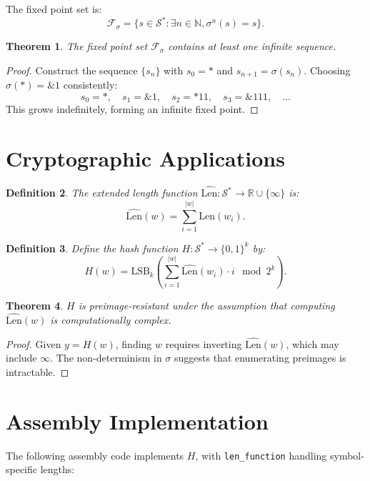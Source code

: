 \documentclass{article}
\newtheorem{theorem}{Theorem}[section]
\newtheorem{definition}[theorem]{Definition}
\begin{document}
The fixed point set is:
\[
\mathcal{F}_\sigma = \{s \in \mathcal{S}^* : \exists n \in \mathbb{N}, \sigma^n(s) = s\}.
\]

\begin{theorem}
    The fixed point set $\mathcal{F}_\sigma$ contains at least one infinite sequence.
\end{theorem}

\begin{proof}
    Construct the sequence $\{s_n\}$ with $s_0 = *$ and $s_{n+1} = \sigma(s_n)$. Choosing $\sigma(*) = \mathbin{\&}1$ consistently:
    \[
    s_0 = *, \quad s_1 = \mathbin{\&}1, \quad s_2 = *11, \quad s_3 = \mathbin{\&}111, \quad \ldots
    \]
    This grows indefinitely, forming an infinite fixed point.
\end{proof}

\section{Cryptographic Applications}
\begin{definition}
    The extended length function $\hat{\text{Len}}: \mathcal{S}^* \to \mathbb{R} \cup \{\infty\}$ is:
    \[
    \hat{\text{Len}}(w) = \sum_{i=1}^{|w|} \text{Len}(w_i).
    \]
\end{definition}

\begin{definition}
    Define the hash function $H: \mathcal{S}^* \to \{0,1\}^k$ by:
    \[
    H(w) = \text{LSB}_k \left( \sum_{i=1}^{|w|} \hat{\text{Len}}(w_i) \cdot i \mod 2^k \right).
    \]
\end{definition}

\begin{theorem}
    $H$ is preimage-resistant under the assumption that computing $\hat{\text{Len}}(w)$ is computationally complex.
\end{theorem}

\begin{proof}
    Given $y = H(w)$, finding $w$ requires inverting $\hat{\text{Len}}(w)$, which may include $\infty$. The non-determinism in $\sigma$ suggests that enumerating preimages is intractable.
\end{proof}

\section{Assembly Implementation}
The following assembly code implements $H$, with \texttt{len\_function} handling symbol-specific lengths:
\end{document}
